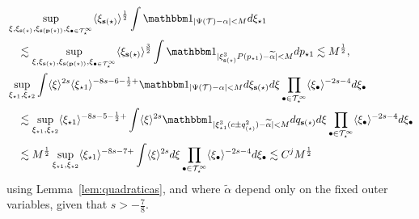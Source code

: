 \documentclass[%
11pt,  reqno]{amsart}
\newcommand{\5}{\textup{V}}
\newcommand{\ind}{\mathbbm 1}
\newcommand{\les}{\lesssim}
\newcommand{\wt}{\widetilde}
\theoremstyle{remark}
\newcommand{\bul}{\bullet}
\newcommand{\TT}{\mathcal{T}}
\newcommand{\al}{\alpha}
\newcommand{\pb}{\mathbf{p}}
\newcommand{\sbf}{\mathbf{s}}
\newcommand{\jb}[1]
{\langle #1 \rangle}
\numberwithin{equation}{section}
\numberwithin{theorem}{section}
\begin{document}
\begin{align}
&
\sup_{\xi, \xi_{\sbf(\star)}, \xi_{\sbf(\pb(\star))}, \xi_{\bul\in\TT^\infty_\star}}
\jb{\xi_{\sbf(\star)}}^{\frac12}
\int 
 \ind_{|\Psi(\TT) - \al| < M
} 
d\xi_{\star1} 
\\
&
\quad 
\les 
\sup_{\xi, \xi_{\sbf(\star)}, \xi_{\sbf(\pb(\star))}, \xi_{\bul\in\TT^\infty_\star}}
\jb{\xi_{\sbf(\star)}}^{\frac32}
\int 
\ind_{|\xi^3_{\sbf(\star)} P(p_{\star1}) - \wt\al | < M } dp_{\star1}
\les 
M^\frac12,
\\
&
\sup_{\xi_{\star1} , \xi_{\star2}}
\int \jb{\xi}^{2s} \jb{\xi_{\star1}}^{-8s  - 6 - \frac12 +  } \ind_{|\Psi(\TT) - \al| < M } d\xi_{\sbf(\star)} d\xi \prod_{\bul \in \TT^\infty_\star} \jb{\xi_\bul}^{-2s-4} d\xi_\bul 
\\
&
\quad 
\les 
\sup_{\xi_{\star1} , \xi_{\star2}}
\jb{\xi_{\star1}}^{-8s - 5 - \frac12 + } 
\int \jb{\xi}^{2s}
\ind_{| \xi^3_{\star1} (c \pm q_{\bf(\star)}^2 ) - \wt\al| < M } d q_{\sbf(\star)} d\xi 
\prod_{\bul \in \TT^\infty_\star} \jb{\xi_\bul}^{-2s-4} d\xi_\bul 
\\
&
\quad 
\les M^\frac12 
\sup_{\xi_{\star1} , \xi_{\star2}}
\jb{\xi_{\star1}}^{-8s - 7 + } 
\int 
\jb{\xi}^{2s} d\xi \prod_{\bul \in \TT^\infty_\star} \jb{\xi_\bul}^{-2s-4} d\xi_\bul 
\les C^j M^\frac12
\end{align}
using Lemma~\ref{lem:quadraticas}, and 
where $\wt\al$ depend only on the fixed outer variables, given that $s>- \frac78$.  
\end{document}
